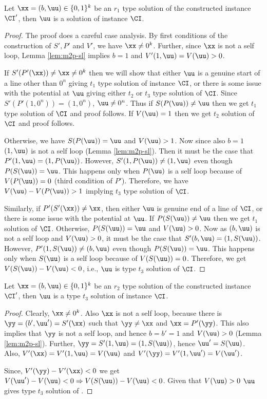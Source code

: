 \begin{lemma}\label{lem:m2p-r1}
Let $\xx=(b,\uu)\in \{0,1\}^k$ be an $r_1$ type solution of the constructed \EOPL instance $\CI'$, then $\uu$ is a solution of \EOML instance $\CI$.
\end{lemma}
\begin{proof}
The proof does a careful case analysis. 
By first conditions of the construction of $S',P'$ and $V'$, we have $\xx \neq 0^k$. 
Further, since $\xx$ is not a self loop, Lemma \ref{lem:m2p-sl} implies $b=1$  and $V'(1,\uu)=V(\uu)>0$.
\medskip

If $S'(P'(\xx))\neq \xx\neq 0^k$ then we will show that either $\uu$ is a genuine start of a line other than $0^n$ giving $t_1$ type solution of \EOML instance $\CI$, or there is some issue with the potential at $\uu$ giving either $t_2$ or $t_3$ type solution of $\CI$. Since $S'(P'(1,0^n))=(1,0^n)$, $\uu \neq 0^n$. Thus if $S(P(\uu))\neq \uu$ then we get $t_1$ type solution of $\CI$ and proof follows. If $V(\uu)=1$ then we get $t_2$ solution of $\CI$ and proof follows. 

Otherwise, we have $S(P(\uu))=\uu$ and $V(\uu)>1$. Now since also $b=1$ $(1,\uu)$ is not a self loop (Lemma \ref{lem:m2p-sl}). %
Then it must be the case that $P'(1,\uu)=(1,P(\uu))$. However, $S'(1,P(\uu))\neq (1,\uu)$ even though $P(S(\uu))=\uu$. This happens only when $P(\uu)$ is a self loop because of $V(P(\uu))=0$ (third condition of $P'$).
Therefore, we have $V(\uu)-V(P(\uu))>1$ implying $t_3$ type solution of $\CI$. 
\medskip

Similarly, if $P'(S'(\xx))\neq \xx$, then either $\uu$ is genuine end of a line of $\CI$, or there is some issue with the potential at $\uu$. If $P(S(\uu))\neq \uu$ then we get $t_1$ solution of $\CI$. Otherwise, $P(S(\uu))=\uu$ and $V(\uu)>0$. Now as $(b,\uu)$ is not a self loop and $V(\uu)>0$, it must be the case that $S'(b,\uu)=(1,S(\uu))$. However, $P'(1, S(\uu))\neq (b,\uu)$ even though $P(S(\uu))=\uu$. This happens only when $S(\uu)$ is a self loop because of $V(S(\uu))=0$. Therefore, we get $V(S(\uu))-V(\uu)<0$, i.e., $\uu$ is type $t_3$ solution of $\CI$. 
\end{proof}

\begin{lemma}\label{lem:m2p-r2}
Let $\xx=(b,\uu)\in \{0,1\}^k$ be an $r_2$ type solution of the constructed \EOPL instance $\CI'$, then $\uu$ is a type $t_3$ solution of \EOML instance $\CI$.
\end{lemma}
\begin{proof}
Clearly, $\xx\neq 0^k$. Also $\xx$ is not a self loop, because there is $\yy=(b',\uu')=S'(\xx)$ such that $\yy \neq \xx$ and $\xx=P'(\yy)$. This also implies that $\yy$ is not a self loop, and hence $b=b'=1$ and $V(\uu)>0$ (Lemma \ref{lem:m2p-sl}). Further, $\yy = S'(1,\uu)=(1,S(\uu))$, hence $\uu'=S(\uu)$. Also, $V'(\xx)=V'(1,\uu)=V(\uu)$ and $V'(\yy)=V'(1,\uu')=V(\uu')$. 

Since, $V'(\yy)-V'(\xx)<0$ we get $V(\uu')-V(\uu)<0 \Rightarrow V(S(\uu)) - V(\uu) <0$. Given that $V(\uu)>0$ $\uu$ gives type $t_3$ solution of \EOML.
\end{proof}

